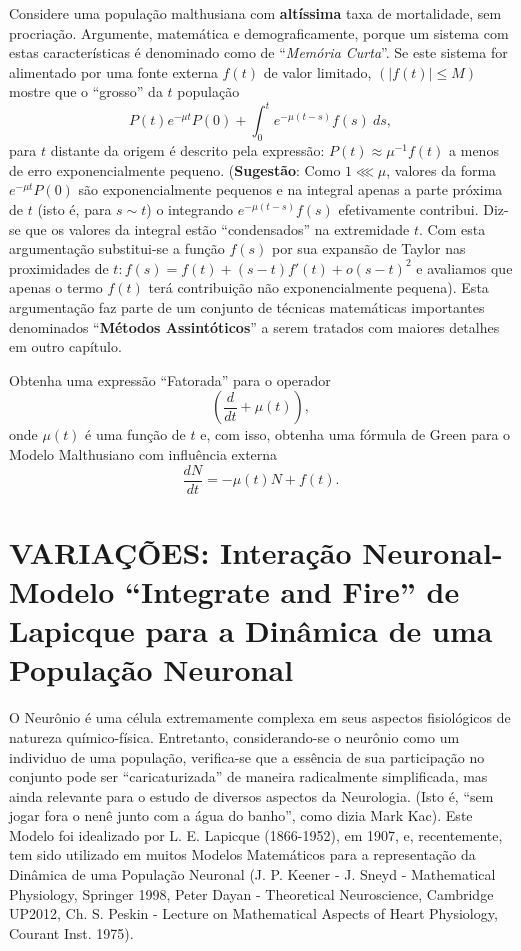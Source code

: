     \begin{exercise}
    Considere uma população malthusiana com \textbf{altíssima} taxa de mortalidade, sem procriação. Argumente, matemática e demograficamente, porque um sistema com estas características é denominado como de ``\textit{Memória Curta}''. Se este sistema for alimentado por uma fonte externa \(f(t)\) de valor limitado, \((|f(t)| \le M)\) mostre que o ``grosso'' da \(t\) população
    \[P(t) e^{-\mu t} P(0) + \int_{0}^{t} e^{-\mu(t-s)} f(s)\ ds,\]
    para \(t\) distante da origem é descrito pela expressão: \(P(t) \approx \mu^{-1} f(t)\) a menos de erro exponencialmente pequeno. (\textbf{Sugestão}: Como \(1 \lll \mu\), valores da forma \(e^{-\mu t} P(0)\) são exponencialmente pequenos e na integral apenas a parte próxima de \(t\) (isto é, para \(s \sim t\)) o integrando \(e^{-\mu(t-s)} f(s)\) efetivamente contribui. Diz-se que os valores da integral estão ``condensados'' na extremidade \(t\). Com esta argumentação substitui-se a função \(f(s)\) por sua expansão de Taylor nas proximidades de \(t: f(s) = f(t)+(s-t) f'(t)+o(s-t)^2\) e avaliamos que apenas o termo \(f(t)\) terá contribuição não exponencialmente pequena). Esta argumentação faz parte de um conjunto de técnicas matemáticas importantes denominados ``\textbf{Métodos Assintóticos}'' a serem tratados com maiores detalhes em outro capítulo.
    \end{exercise}

    \begin{exercise}
    Obtenha uma expressão ``Fatorada'' para o operador
    \[\left(\dfrac{d}{dt} + \mu(t)\right),\]
    onde \(\mu(t)\) é uma função de \(t\) e, com isso, obtenha uma fórmula de Green para o Modelo Malthusiano com influência externa
    \[\dfrac{dN}{dt} = -\mu(t)N + f(t).\]
    \end{exercise}

\section{VARIAÇÕES: Interação Neuronal- Modelo ``Integrate and Fire'' de Lapicque para a Dinâmica de uma População Neuronal}

    O Neurônio é uma célula extremamente complexa em seus aspectos fisiológicos de natureza químico-física. Entretanto, considerando-se o neurônio como um individuo de uma população, verifica-se que a essência de sua participação no conjunto pode ser ``caricaturizada'' de maneira radicalmente simplificada, mas ainda relevante para o estudo de diversos aspectos da Neurologia. (Isto é, ``sem jogar fora o nenê junto com a água do banho'', como dizia Mark Kac). Este Modelo foi idealizado por L. E. Lapicque (1866-1952), em 1907, e, recentemente, tem sido utilizado em muitos Modelos Matemáticos para a representação da Dinâmica de uma População Neuronal (J. P. Keener - J. Sneyd - Mathematical Physiology, Springer 1998, Peter Dayan - Theoretical Neuroscience, Cambridge UP2012, Ch. S. Peskin - Lecture on Mathematical Aspects of Heart Physiology, Courant Inst. 1975). 

